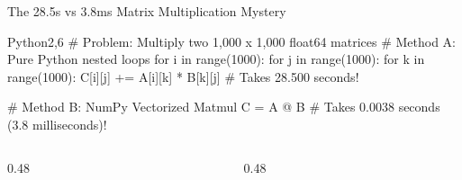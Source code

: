 

\begin{frame}[fragile]{The 28.5s vs 3.8ms Matrix Multiplication Mystery}
  \begin{HighlightedCodeBlock}{Python}{2,6}
# Problem: Multiply two 1,000 x 1,000 float64 matrices
# Method A: Pure Python nested loops
for i in range(1000):
    for j in range(1000):
        for k in range(1000):
            C[i][j] += A[i][k] * B[k][j]  # Takes 28.500 seconds!

# Method B: NumPy Vectorized Matmul
C = A @ B  # Takes 0.0038 seconds (3.8 milliseconds)!
  \end{HighlightedCodeBlock}
  \vfill
  \begin{columns}[c,onlytextwidth]
    \begin{column}{0.48\textwidth}
    \end{column}
    \begin{column}{0.48\textwidth}
    \end{column}
  \end{columns}
\end{frame}


